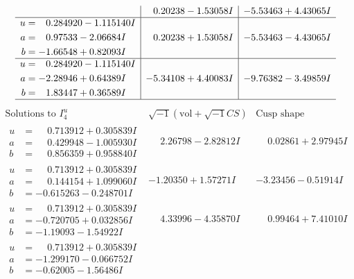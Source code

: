 \documentclass[1p]{elsarticle_modified}
\theoremstyle{definition}
\newcommand{\I}{\sqrt{-1}}
\begin{document}
$$\begin{array}{c|c|c}
 & \phantom{-}0.20238 - 1.53058 I & -5.53463 + 4.43065 I \\ \hline\begin{aligned}
u &= \phantom{-}0.284920 - 1.115140 I \\
a &= \phantom{-}0.97533 - 2.06684 I \\
b &= -1.66548 + 0.82093 I\end{aligned}
 & \phantom{-}0.20238 + 1.53058 I & -5.53463 - 4.43065 I \\ \hline\begin{aligned}
u &= \phantom{-}0.284920 - 1.115140 I \\
a &= -2.28946 + 0.64389 I \\
b &= \phantom{-}1.83447 + 0.36589 I\end{aligned}
 & -5.34108 + 4.40083 I & -9.76382 - 3.49859 I\\
 \hline 
 \end{array}$$\newpage$$\begin{array}{c|c|c}  
\text{Solutions to }I^u_{4}& \I (\text{vol} + \sqrt{-1}CS) & \text{Cusp shape}\\
 \hline 
\begin{aligned}
u &= \phantom{-}0.713912 + 0.305839 I \\
a &= \phantom{-}0.429948 - 1.005930 I \\
b &= \phantom{-}0.856359 + 0.958840 I\end{aligned}
 & \phantom{-}2.26798 - 2.82812 I & \phantom{-}0.02861 + 2.97945 I \\ \hline\begin{aligned}
u &= \phantom{-}0.713912 + 0.305839 I \\
a &= \phantom{-}0.144154 + 1.099060 I \\
b &= -0.615263 - 0.248701 I\end{aligned}
 & -1.20350 + 1.57271 I & -3.23456 - 0.51914 I \\ \hline\begin{aligned}
u &= \phantom{-}0.713912 + 0.305839 I \\
a &= -0.720705 + 0.032856 I \\
b &= -1.19093 - 1.54922 I\end{aligned}
 & \phantom{-}4.33996 - 4.35870 I & \phantom{-}0.99464 + 7.41010 I \\ \hline\begin{aligned}
u &= \phantom{-}0.713912 + 0.305839 I \\
a &= -1.299170 - 0.066752 I \\
b &= -0.62005 - 1.56486 I\end{aligned}

\end{array}$$
\end{document}
